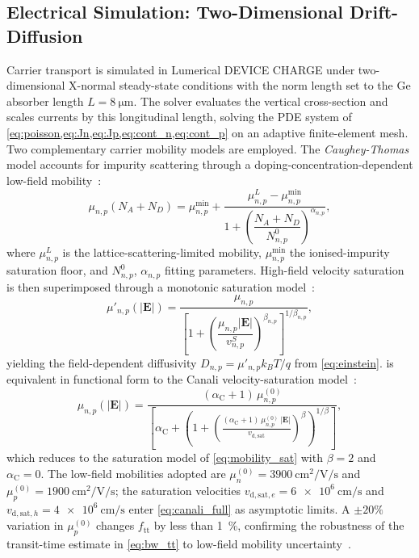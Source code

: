 \subsection[Electrical Simulation: CHARGE]{Electrical Simulation: Two-Dimensional Drift-Diffusion}
\label{subsec:pd_charge}

Carrier transport is simulated in Lumerical DEVICE CHARGE under
two-dimensional X-normal steady-state conditions with the norm length set to
the Ge absorber length $L=\SI{8}{\micro\metre}$. The solver evaluates the
vertical cross-section and scales currents by this longitudinal length, solving
the PDE system of
\cref{eq:poisson,eq:Jn,eq:Jp,eq:cont_n,eq:cont_p} on an adaptive
finite-element mesh. Two complementary carrier mobility models are employed.
The \emph{Caughey-Thomas} model accounts for impurity scattering through a
doping-concentration-dependent low-field mobility~\cite{Hamadou2023}:
\begin{equation}
    \mu_{n,p}(N_A+N_D)
    = \mu^{\min}_{n,p}
      + \frac{\mu^L_{n,p} - \mu^{\min}_{n,p}}
             {1 + \left(\dfrac{N_A+N_D}{N^0_{n,p}}\right)^{\!\alpha_{n,p}}},
    \label{eq:sim_caughey_thomas}
\end{equation}
where $\mu^L_{n,p}$ is the lattice-scattering-limited mobility, $\mu^{\min}_{n,p}$
the ionised-impurity saturation floor, and $N^0_{n,p}$, $\alpha_{n,p}$ fitting
parameters. High-field velocity saturation is then superimposed through a
monotonic saturation model~\cite{Hamadou2023}:
\begin{equation}
    \mu'_{n,p}(|\mathbf{E}|)
    = \frac{\mu_{n,p}}
           {\left[1
             + \left(\dfrac{\mu_{n,p}|\mathbf{E}|}{v^S_{n,p}}
               \right)^{\!\beta_{n,p}}
           \right]^{\!1/\beta_{n,p}}},
    \label{eq:highfield_mob}
\end{equation}
yielding the field-dependent diffusivity $D_{n,p}=\mu'_{n,p}k_BT/q$ from
\cref{eq:einstein}.  is equivalent in functional form
to the Canali velocity-saturation model~\cite{Alasio2024}:
\begin{equation}
    \mu_{n,p}(|\mathbf{E}|)
    = \frac{(\alpha_{\mathrm{C}}+1)\,\mu_{n,p}^{(0)}}
      {\left[\alpha_{\mathrm{C}}
        + \!\left(1 + \!\left(\frac{(\alpha_{\mathrm{C}}+1)\,
          \mu_{n,p}^{(0)}\,|\mathbf{E}|}{v_{\mathrm{d,sat}}}\right)^{\!\beta}
        \right)^{1/\beta}\right]},
    \label{eq:canali_full}
\end{equation}
which reduces to the saturation model of \cref{eq:mobility_sat} with $\beta=2$
and $\alpha_{\mathrm{C}}=0$. The low-field mobilities adopted are
$\mu_n^{(0)}=\SI{3900}{\centi\metre\squared\per\volt\per\second}$ and
$\mu_p^{(0)}=\SI{1900}{\centi\metre\squared\per\volt\per\second}$; the
saturation velocities
$v_{\mathrm{d,sat},e}=\SI{6e6}{\centi\metre\per\second}$ and
$v_{\mathrm{d,sat},h}=\SI{4e6}{\centi\metre\per\second}$ enter
\cref{eq:canali_full} as asymptotic limits. A $\pm20\%$ variation in
$\mu_p^{(0)}$ changes $f_{\mathrm{tt}}$ by less than \SI{1}{\percent},
confirming the robustness of the transit-time estimate in \cref{eq:bw_tt}
to low-field mobility uncertainty~\cite{Alasio2024}.

